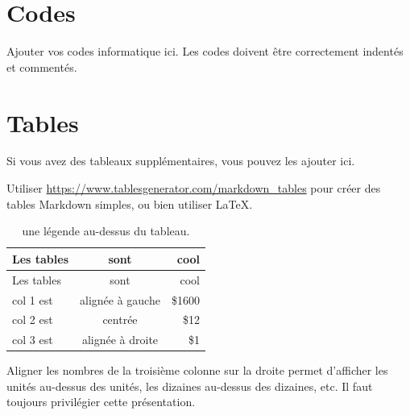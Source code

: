 \documentclass[mstat,12pt]{unswthesis}
\begin{document}
\section*{\texorpdfstring{\textbf{Codes}}{Codes}}\label{codes}

Ajouter vos codes informatique ici. Les codes doivent être correctement
indentés et commentés.

\section*{\texorpdfstring{\textbf{Tables}}{Tables}}\label{tables}

Si vous avez des tableaux supplémentaires, vous pouvez les ajouter ici.

Utiliser \url{https://www.tablesgenerator.com/markdown_tables} pour
créer des tables Markdown simples, ou bien utiliser \LaTeX.

\begin{longtable}[]{@{}lcr@{}}
\caption{une légende au-dessus du tableau.
\label{tab7.1}}\tabularnewline
\toprule\noalign{}
Les tables & sont & cool \\
\midrule\noalign{}
\endfirsthead
\toprule\noalign{}
Les tables & sont & cool \\
\midrule\noalign{}
\endhead
\bottomrule\noalign{}
\endlastfoot
col 1 est & alignée à gauche & \$1600 \\
col 2 est & centrée & \$12 \\
col 3 est & alignée à droite & \$1 \\
\end{longtable}

Aligner les nombres de la troisième colonne sur la droite permet
d'afficher les unités au-dessus des unités, les dizaines au-dessus des
dizaines, etc. Il faut toujours privilégier cette présentation.
\end{document}
